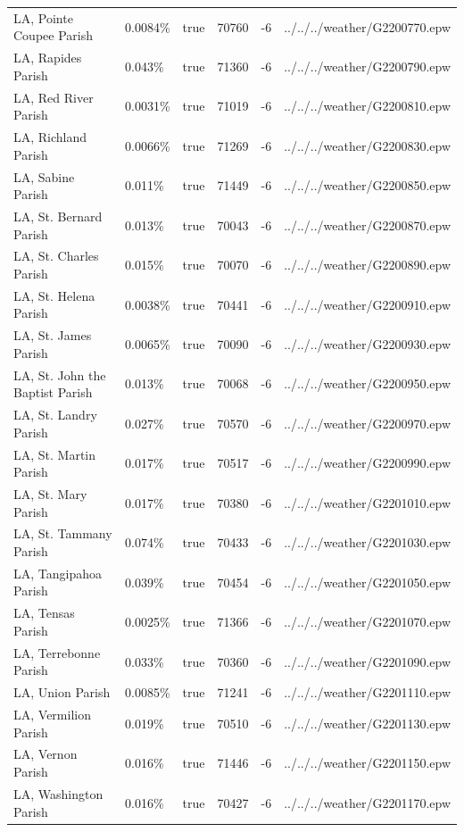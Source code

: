 \begin{longtable}[]{@{}llllll@{}}
LA, Pointe Coupee Parish & 0.0084\% & true & 70760 & -6 &
../../../weather/G2200770.epw \\
LA, Rapides Parish & 0.043\% & true & 71360 & -6 &
../../../weather/G2200790.epw \\
LA, Red River Parish & 0.0031\% & true & 71019 & -6 &
../../../weather/G2200810.epw \\
LA, Richland Parish & 0.0066\% & true & 71269 & -6 &
../../../weather/G2200830.epw \\
LA, Sabine Parish & 0.011\% & true & 71449 & -6 &
../../../weather/G2200850.epw \\
LA, St. Bernard Parish & 0.013\% & true & 70043 & -6 &
../../../weather/G2200870.epw \\
LA, St. Charles Parish & 0.015\% & true & 70070 & -6 &
../../../weather/G2200890.epw \\
LA, St. Helena Parish & 0.0038\% & true & 70441 & -6 &
../../../weather/G2200910.epw \\
LA, St. James Parish & 0.0065\% & true & 70090 & -6 &
../../../weather/G2200930.epw \\
LA, St. John the Baptist Parish & 0.013\% & true & 70068 & -6 &
../../../weather/G2200950.epw \\
LA, St. Landry Parish & 0.027\% & true & 70570 & -6 &
../../../weather/G2200970.epw \\
LA, St. Martin Parish & 0.017\% & true & 70517 & -6 &
../../../weather/G2200990.epw \\
LA, St. Mary Parish & 0.017\% & true & 70380 & -6 &
../../../weather/G2201010.epw \\
LA, St. Tammany Parish & 0.074\% & true & 70433 & -6 &
../../../weather/G2201030.epw \\
LA, Tangipahoa Parish & 0.039\% & true & 70454 & -6 &
../../../weather/G2201050.epw \\
LA, Tensas Parish & 0.0025\% & true & 71366 & -6 &
../../../weather/G2201070.epw \\
LA, Terrebonne Parish & 0.033\% & true & 70360 & -6 &
../../../weather/G2201090.epw \\
LA, Union Parish & 0.0085\% & true & 71241 & -6 &
../../../weather/G2201110.epw \\
LA, Vermilion Parish & 0.019\% & true & 70510 & -6 &
../../../weather/G2201130.epw \\
LA, Vernon Parish & 0.016\% & true & 71446 & -6 &
../../../weather/G2201150.epw \\
LA, Washington Parish & 0.016\% & true & 70427 & -6 &
../../../weather/G2201170.epw \\

\end{longtable}
